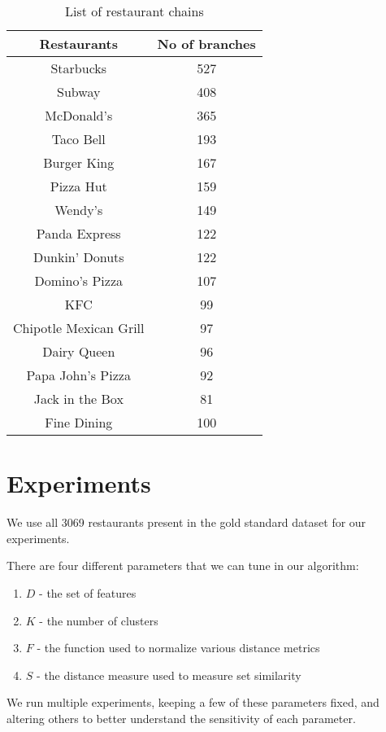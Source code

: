 \documentclass{article}
\begin{document}
\begin{table}
\begin{center}
\begin{tabular}{| c | c | }
  \hline
  Restaurants & No of branches  \\ \hline
  Starbucks & 527 \\
  Subway & 408 \\
  McDonald's & 365 \\
  Taco Bell & 193 \\
  Burger King & 167 \\
  Pizza Hut & 159 \\
  Wendy's & 149 \\
  Panda Express & 122 \\
  Dunkin' Donuts & 122 \\
  Domino's Pizza & 107 \\
  KFC & 99 \\
  Chipotle Mexican Grill & 97 \\
  Dairy Queen & 96 \\
  Papa John's Pizza & 92 \\
  Jack in the Box & 81\\
  Fine Dining & 100 \\
  \hline
\end{tabular}
\caption{List of restaurant chains}
\label{tab:chain}
\end{center}
\end{table}

\section{Experiments}
We use all 3069 restaurants present in the gold standard dataset for our experiments.

There are four different parameters that we can tune in our algorithm:
\begin{enumerate}
	\item $D$ - the set of features
    \item $K$ - the number of clusters
    \item $F$ - the function used to normalize various distance metrics
    \item $S$ - the distance measure used to measure set similarity
\end{enumerate}

We run multiple experiments, keeping a few of these parameters fixed, and altering others to better understand the sensitivity of each parameter.
\end{document}
